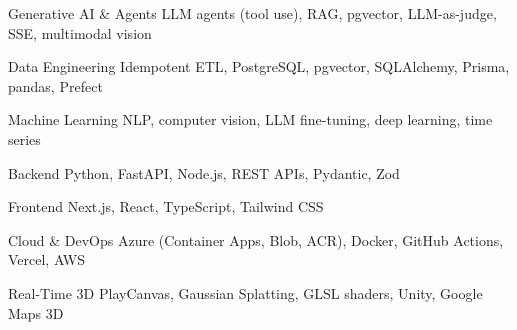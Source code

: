 


\begin{cvskills}


\cvskill
{Generative AI \& Agents}
{LLM agents (tool use), RAG, pgvector, LLM-as-judge, SSE, multimodal vision}


\cvskill
{Data Engineering}
{Idempotent ETL, PostgreSQL, pgvector, SQLAlchemy, Prisma, pandas, Prefect}


\cvskill
{Machine Learning}
{NLP, computer vision, LLM fine-tuning, deep learning, time series}


\cvskill
{Backend}
{Python, FastAPI, Node.js, REST APIs, Pydantic, Zod}


\cvskill
{Frontend}
{Next.js, React, TypeScript, Tailwind CSS}


\cvskill
{Cloud \& DevOps}
{Azure (Container Apps, Blob, ACR), Docker, GitHub Actions, Vercel, AWS}


\cvskill
{Real-Time 3D}
{PlayCanvas, Gaussian Splatting, GLSL shaders, Unity, Google Maps 3D}


\end{cvskills}
